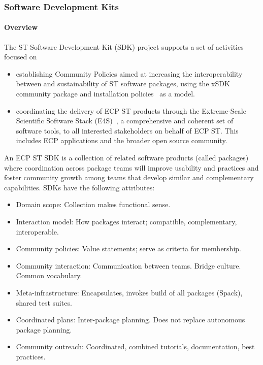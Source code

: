 \subsubsection{ Software Development Kits} \label{subsubsect:ecosystem-sdk}

\paragraph{Overview} The ST Software Development Kit (SDK) project supports a set of activities focused on 
\begin{itemize}
\item establishing Community Policies aimed at increasing the interoperability between and sustainability of ST software packages, using the xSDK~\cite{xsdk:homepage} community package and installation policies~\cite{xsdk-policies:homepage} as a model.
\item coordinating the delivery of ECP ST products through the Extreme-Scale Scientific Software Stack (E4S)~\cite{e4s:homepage}, a comprehensive and coherent set of software tools, to all interested stakeholders on behalf of ECP ST. This includes ECP applications and the broader open source community.
\end{itemize}

An ECP ST SDK is a collection of related software products (called packages) where coordination across package teams will improve usability and practices and foster community growth among teams that develop similar and complementary capabilities.  SDKs have the following attributes:
\begin{itemize}
\item Domain scope: Collection makes functional sense.
\item Interaction model: How packages interact; compatible, complementary, interoperable.
\item Community policies: Value statements; serve as criteria for membership.
\item Community interaction: Communication between teams. Bridge culture. Common vocabulary.
\item Meta-infrastructure: Encapsulates, invokes build of all packages (Spack), shared test suites.
\item Coordinated plans: Inter-package planning. Does not replace autonomous package planning.
\item Community outreach: Coordinated, combined tutorials, documentation, best practices.
\end{itemize}

